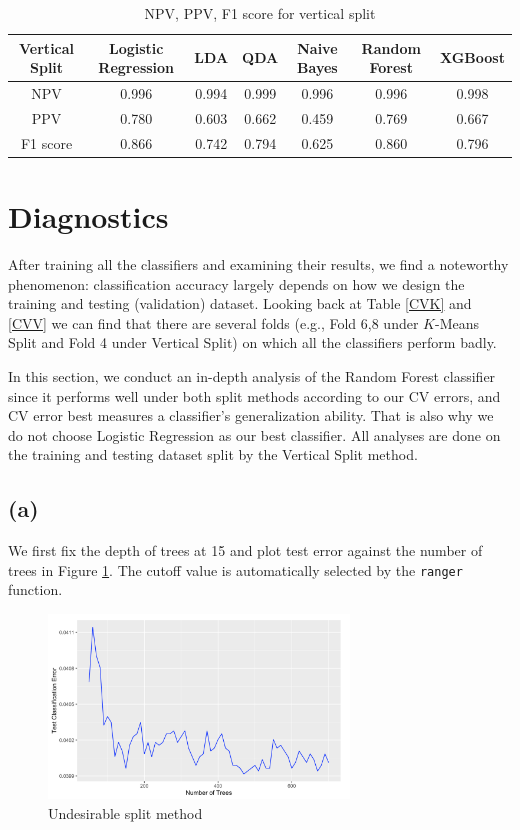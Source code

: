 \documentclass[11pt]{article}
\theoremstyle{definition}
\begin{document}
\begin{table}[h]
    \centering
    \begin{tabular}{c||c|c|c|c|c|c}
     Vertical Split & Logistic Regression & LDA & QDA & Naive Bayes & Random Forest & XGBoost \\
    \hline
    \hline
    NPV
    & 0.996 & 0.994 & 0.999 & 0.996 & 0.996 & 0.998 \\
    \hline
    PPV
    & 0.780
    & 0.603 & 0.662 & 0.459 & 0.769 & 0.667 \\
    \hline
    F1 score
    & 0.866 & 0.742 & 0.794 & 0.625 & 0.860 & 0.796
    \end{tabular}
    \caption{NPV, PPV, F1 score for vertical split}
    \label{metricsV}
\end{table}
\FloatBarrier

\section{Diagnostics}
After training all the classifiers and examining their results, we find a noteworthy phenomenon: classification accuracy largely depends on how we design the training and testing (validation) dataset. Looking back at Table \ref{CVK} and \ref{CVV} we can find that there are several folds (e.g., Fold 6,8 under $K$-Means Split and Fold 4 under Vertical Split) on which all the classifiers perform badly. 

In this section, we conduct an in-depth analysis of the Random Forest classifier since it performs well under both split methods according to our CV errors, and CV error best measures a classifier's generalization ability. That is also why we do not choose Logistic Regression as our best classifier. All analyses are done on the training and testing dataset split by the Vertical Split method. 

\subsection*{(a)}
We first fix the depth of trees at 15 and plot test error against the number of trees in Figure \ref{TCE}. The cutoff value is automatically selected by the \texttt{ranger} function.

\begin{figure}[h]
\small
\centering
\includegraphics[width=8cm]{figures/4a1.png}
\caption{Undesirable split method}
\label{TCE}
\end{figure}
\FloatBarrier
\end{document}
